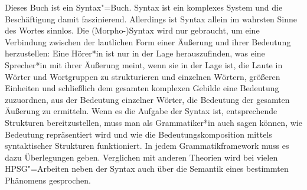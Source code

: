 Dieses Buch ist ein Syntax"=Buch. Syntax ist ein komplexes System und die Beschäftigung damit
faszinierend. Allerdings ist Syntax allein im wahrsten Sinne des Wortes sinnlos. Die (Morpho-)Syntax wird nur gebraucht, um eine
Verbindung zwischen der lautlichen Form einer Äußerung und ihrer Bedeutung herzustellen: Eine
Hörer*in ist nur in der Lage herauszufinden, was eine Sprecher*in mit ihrer Äußerung meint, wenn
sie in der Lage ist, die Laute in Wörter und Wortgruppen zu strukturieren und einzelnen Wörtern,
größeren Einheiten und schließlich dem gesamten komplexen Gebilde
eine Bedeutung zuzuordnen, \dash aus der Bedeutung einzelner Wörter, die Bedeutung der gesamten
Äußerung zu ermitteln. Wenn es die Aufgabe der Syntax ist, entsprechende Strukturen bereitzustellen,
muss man als Grammatiker*in auch sagen können, wie Bedeutung repräsentiert wird und wie die
Bedeutungskomposition mittels syntaktischer Strukturen funktioniert. In jedem Grammatikframework
muss es dazu Überlegungen geben. Verglichen mit anderen Theorien wird bei vielen HPSG"=Arbeiten
neben der Syntax auch über die Semantik eines bestimmten Phänomens gesprochen.

